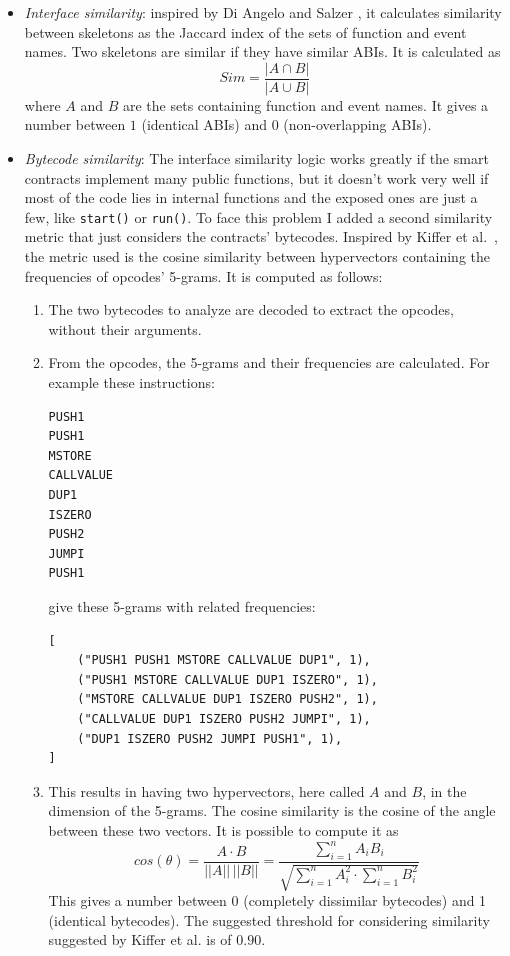\begin{itemize}
    \item \textit{Interface similarity}: inspired by Di Angelo and Salzer \cite{clustering-sc}, it calculates similarity between skeletons as the Jaccard index of the sets of function and event names. Two skeletons are similar if they have similar ABIs. It is calculated as 
    \begin{equation}
	Sim = \frac{|A\cap B|}{|A\cup B|}
    \end{equation}
    where $A$ and $B$ are the sets containing function and event names. It gives a number between $1$ (identical ABIs) and $0$ (non-overlapping ABIs).
    
    \item \textit{Bytecode similarity}: The interface similarity logic works greatly if the smart contracts implement many public functions, but it doesn’t work very well if most of the code lies in internal functions and the exposed ones are just a few, like \texttt{start()} or \texttt{run()}. 
    To face this problem I added a second similarity metric that just considers the contracts' bytecodes. Inspired by Kiffer et al.~\cite{ethereum-sc-topology}, the metric used is the cosine similarity between hypervectors containing the frequencies of opcodes' 5-grams. It is computed as follows:
    \begin{enumerate}
        \item The two bytecodes to analyze are decoded to extract the opcodes, without their arguments.
        \item From the opcodes, the 5-grams and their frequencies are calculated. For example these instructions: 
        \begin{lstlisting}
PUSH1
PUSH1
MSTORE
CALLVALUE
DUP1
ISZERO
PUSH2
JUMPI
PUSH1\end{lstlisting}
        give these 5-grams with related frequencies:
        \begin{lstlisting}
[
    ("PUSH1 PUSH1 MSTORE CALLVALUE DUP1", 1),
    ("PUSH1 MSTORE CALLVALUE DUP1 ISZERO", 1),
    ("MSTORE CALLVALUE DUP1 ISZERO PUSH2", 1),
    ("CALLVALUE DUP1 ISZERO PUSH2 JUMPI", 1),
    ("DUP1 ISZERO PUSH2 JUMPI PUSH1", 1),
]       \end{lstlisting}
        \item This results in having two hypervectors, here called $A$ and $B$, in the dimension of the 5-grams. The cosine similarity is the cosine of the angle between these two vectors. It is possible to compute it as 
        \[
        cos(\theta)=\frac{A \cdot B}{||A||\,||B||}=\frac{\sum\limits_{i=1}^{n}A_iB_i}{ \sqrt{\sum\limits_{i=1}^{n}A^2_i \cdot \sum\limits_{i=1}^{n}B^2_i} }
        \]
        This gives a number between 0 (completely dissimilar bytecodes) and 1 (identical bytecodes). The suggested threshold for considering similarity suggested by Kiffer et al. is of $0.90$.
    \end{enumerate}
\end{itemize}

